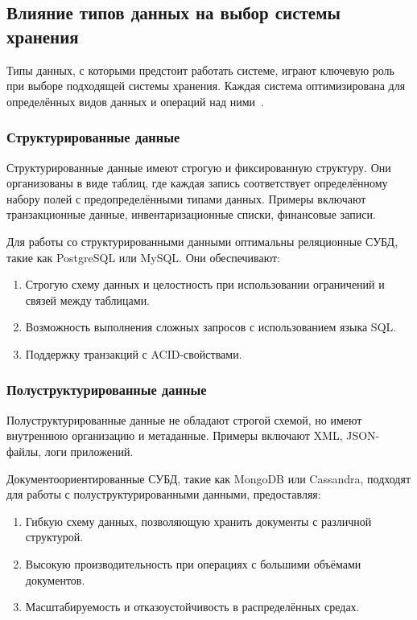 \subsection{Влияние типов данных на выбор системы хранения}

Типы данных, с которыми предстоит работать системе, играют ключевую роль при выборе подходящей системы хранения. 
Каждая система оптимизирована для определённых видов данных и операций над ними~\cite{systems}.

\subsubsection{Структурированные данные}

Структурированные данные имеют строгую и фиксированную структуру. 
Они организованы в виде таблиц, где каждая запись соответствует определённому набору полей с предопределёнными типами данных. 
Примеры включают транзакционные данные, инвентаризационные списки, финансовые записи.

\clearpage
Для работы со структурированными данными оптимальны реляционные СУБД, такие как PostgreSQL или MySQL. 
Они обеспечивают:

\begin{enumerate}[leftmargin=1.6\parindent]
    \item Строгую схему данных и целостность при использовании ограничений и связей между таблицами.
    \item Возможность выполнения сложных запросов с использованием языка SQL.
    \item Поддержку транзакций с ACID-свойствами.
\end{enumerate}

\subsubsection{Полуструктурированные данные}

Полуструктурированные данные не обладают строгой схемой, но имеют внутреннюю организацию и метаданные. 
Примеры включают XML, JSON-файлы, логи приложений.

Документоориентированные СУБД, такие как MongoDB или Cassandra, подходят для работы с полуструктурированными данными, предоставляя:

\begin{enumerate}[leftmargin=1.6\parindent]
    \item Гибкую схему данных, позволяющую хранить документы с различной структурой.
    \item Высокую производительность при операциях с большими объёмами документов.
    \item Масштабируемость и отказоустойчивость в распределённых средах.
\end{enumerate}

